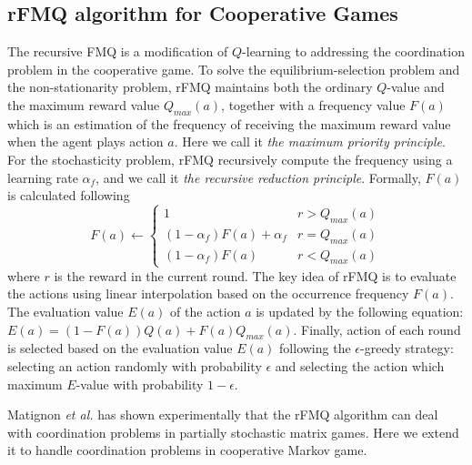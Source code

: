 \documentclass[journal,transmag]{IEEEtran}
\begin{document}
\subsection{rFMQ algorithm for Cooperative Games }
\label{subsection2.3}
The recursive FMQ \cite{Matignon2012} is a modification of $Q$-learning to addressing the coordination problem in the cooperative game. To solve the equilibrium-selection problem and the non-stationarity problem, rFMQ maintains both the ordinary $Q$-value and the maximum reward value $Q_{max}(a)$, together with a frequency value $F(a)$ which is an estimation of the frequency of receiving the maximum reward value when the agent plays action $a$. Here we call it \emph{the maximum priority principle}. For the stochasticity problem, rFMQ recursively compute the frequency using a learning rate $\alpha_f$, and we call it \emph{the recursive reduction principle}. Formally, $F(a)$ is calculated following
\[{F}(a) \leftarrow \left\{ {\begin{array}{*{20}{l}}
1&{r > Q_{max}(a)}\\
{(1 - {\alpha _f}){F}(a) + {\alpha_f}}&{r = Q_{max}(a)}\\
{(1 - {\alpha _f}){F}(a)}&{r < Q_{max}(a)}
\end{array}} \right.\]
where $r$ is the reward in the current round. The key idea of rFMQ is to evaluate the actions using linear interpolation based on the occurrence frequency $F(a)$. The evaluation value $E(a)$ of the action $a$ is updated by the following equation: $E(a)=(1-F(a))Q(a)+F(a)Q_{max}(a)$. Finally, action of each round is selected based on the evaluation value $E(a)$ following the $\epsilon$-greedy strategy: selecting an action randomly with probability $\epsilon$ and selecting the action which maximum $E$-value with probability $1-\epsilon$.

Matignon \emph{et al.} \cite{Matignon2012} has shown experimentally that the rFMQ algorithm can deal with coordination problems in partially stochastic matrix games. Here we extend it to handle coordination problems in cooperative Markov game.



\end{document}
